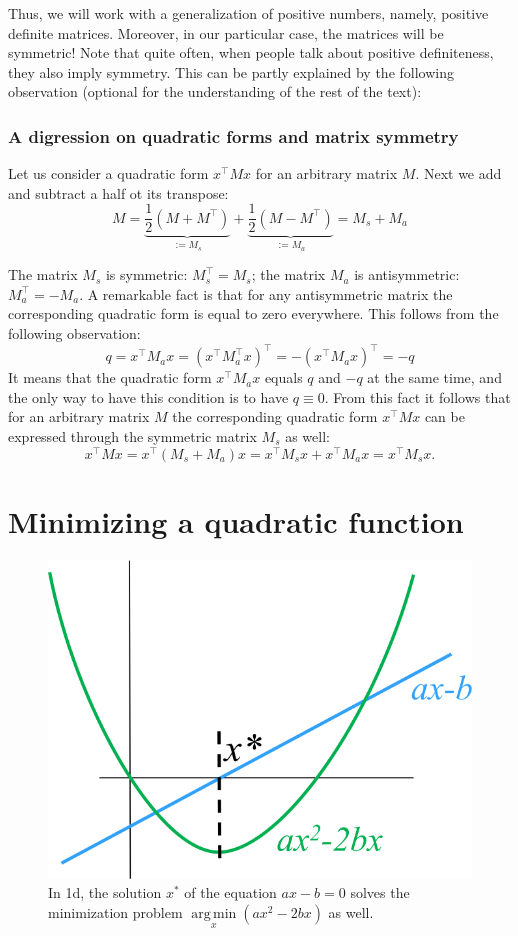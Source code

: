 \documentclass[notitlepage]{report}
\DeclareMathOperator*{\argmin}{arg\,min}
\begin{document}
Thus, we will work with a generalization of positive numbers, namely, positive definite matrices. 
Moreover, in our particular case, the matrices will be symmetric!
Note that quite often, when people talk about positive definiteness, they also imply symmetry.
This can be partly explained by the following observation (optional for the understanding of the rest of the text):

\subsubsection{A digression on quadratic forms and matrix symmetry}

Let us consider a quadratic form $x^\top M x$ for an arbitrary matrix $M$. 
Next we add and subtract a half ot its transpose:
$$
M = \underbrace{\frac{1}{2} (M+M^\top)}_{:=M_s} + \underbrace{\frac{1}{2} (M-M^\top)}_{:=M_a} = M_s + M_a
$$

The matrix $M_s$ is symmetric: $M_s^\top = M_s$; the matrix $M_a$ is antisymmetric: $M_a^\top=-M_a$.
A remarkable fact is that for any antisymmetric matrix the corresponding quadratic form is equal to zero everywhere. This follows from the following observation:
$$
q = x^\top M_a x  = (x^\top M_a^\top x)^\top = - (x^\top M_a x)^\top = -q
$$
It means that the quadratic form $x^\top M_a x$ equals $q$ and $-q$ at the same time, and the only way to have this condition is to have $q\equiv 0$.
From this fact it follows that for an arbitrary matrix $M$ the corresponding quadratic form $x^\top M x$ can be expressed through the symmetric matrix $M_s$ as well:
$$
x^\top M x = x^\top (M_s + M_a) x = x^\top M_s x  + x^\top M_a x = x^\top M_s x.
$$


\section{Minimizing a quadratic function}

\begin{figure}[ht]
	\centering
	\includegraphics[width=.3\linewidth]{minpb1d}
	\caption{In 1d, the solution $x^*$ of the equation $ax - b = 0$ solves the minimization problem $\argmin\limits_x(ax^2-2bx)$ as well. }
	\label{fig:min1d}
\end{figure}
\end{document}
